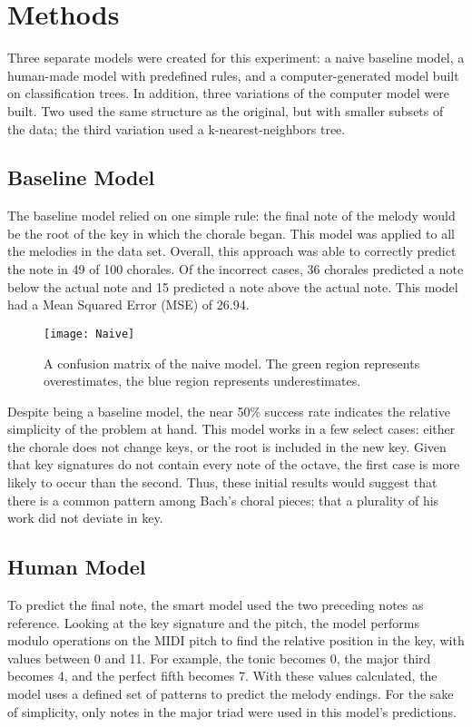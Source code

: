 \documentclass[12pt]{article}
\begin{document}
\section{Methods}
Three separate models were created for this experiment: a naive baseline model, a human-made model with predefined rules, and a computer-generated model built on classification trees. In addition, three variations of the computer model were built. Two used the same structure as the original, but with smaller subsets of the data; the third variation used a k-nearest-neighbors tree.

\subsection{Baseline Model}
The baseline model relied on one simple rule: the final note of the melody would be the root of the key in which the chorale began. This model was applied to all the melodies in the data set. Overall, this approach was able to correctly predict the note in 49 of 100 chorales. Of the incorrect cases, 36 chorales predicted a note below the actual note and 15 predicted a note above the actual note. This model had a Mean Squared Error (MSE) of 26.94.\\

\begin{figure}[h]
  \texttt{[image: Naive]}
  \centering
  \caption{A confusion matrix of the naive model. The green region represents overestimates, the blue region represents underestimates.}
\end{figure}

Despite being a baseline model, the near 50\% success rate indicates the relative simplicity of the problem at hand. This model works in a few select cases: either the chorale does not change keys, or the root is included in the new key. Given that key signatures do not contain every note of the octave, the first case is more likely to occur than the second. Thus, these initial results would suggest that there is a common pattern among Bach's choral pieces; that a plurality of his work did not deviate in key.

\subsection{Human Model}
To predict the final note, the smart model used the two preceding notes as reference. Looking at the key signature and the pitch, the model performs modulo operations on the MIDI pitch to find the relative position in the key, with values between 0 and 11. For example, the tonic becomes 0, the major third becomes 4, and the perfect fifth becomes 7. With these values calculated, the model uses a defined set of patterns to predict the melody endings. For the sake of simplicity, only notes in the major triad were used in this model's predictions.\\
\end{document}
